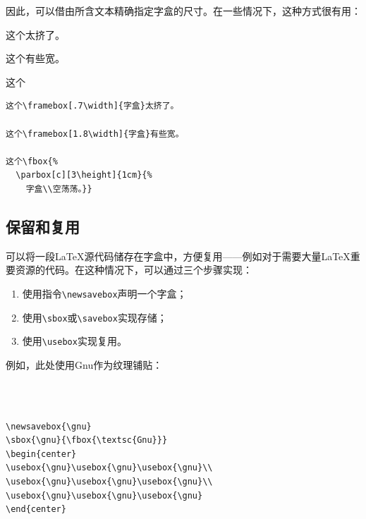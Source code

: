 因此，可以借由所含文本精确指定字盒的尺寸。在一些情况下，这种方式很有用：

\begin{codelist}[4.16]{
  这个太挤了。

  这个有些宽。
  
  这个
}
\begin{verbatim}
这个\framebox[.7\width]{字盒}太挤了。

这个\framebox[1.8\width]{字盒}有些宽。

这个\fbox{%
  \parbox[c][3\height]{1cm}{%
    字盒\\空荡荡。}}\end{verbatim}
\end{codelist}

\subsection{保留和复用}

可以将一段\LaTeX 源代码储存在字盒中，方便复用——例如对于需要大量\LaTeX 重要资源的代码。在这种情况下，可以通过三个步骤实现：

\begin{enumerate}
  \item 使用指令\verb|\newsavebox|声明一个字盒；
  \item 使用\verb|\sbox|或\verb|\savebox|实现存储；
  \item 使用\verb|\usebox|实现复用。
\end{enumerate}

例如，此处使用Gnu作为纹理铺贴：

\begin{codelist}[4.17]{
  \newsavebox{\gnu}
  \begin{center}
  \usebox{\gnu}\usebox{\gnu}\usebox{\gnu}\\
  \usebox{\gnu}\usebox{\gnu}\usebox{\gnu}\\
  \usebox{\gnu}\usebox{\gnu}\usebox{\gnu}
  \end{center}
}
\begin{verbatim}
\newsavebox{\gnu}
\sbox{\gnu}{\fbox{\textsc{Gnu}}}
\begin{center}
\usebox{\gnu}\usebox{\gnu}\usebox{\gnu}\\
\usebox{\gnu}\usebox{\gnu}\usebox{\gnu}\\
\usebox{\gnu}\usebox{\gnu}\usebox{\gnu}
\end{center}\end{verbatim}
\end{codelist}

